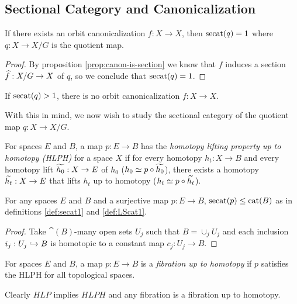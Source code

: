 \subsection{Sectional Category and Canonicalization}\label{sec:secat-and-canon}
\begin{proposition}
    If there exists an orbit canonicalization $f : X \to X$, then $\secat(q) = 1$ where $q : X \to X/G$ is the quotient map.
    \begin{proof}
        By proposition \ref{prop:canon-is-section} we know that $f$ induces a section $\Hat{f} : X/G \to X$ of $q$, so we conclude that $\secat(q) = 1$.
    \end{proof}
\end{proposition}

\begin{corollary}
    If $\secat(q) > 1$, there is no orbit canonicalization $f : X \to X$.
\end{corollary}

With this in mind, we now wish to study the sectional category of the quotient map $q : X \to X/G$.

\begin{definition}
    For spaces $E$ and $B$, a map $p : E \to B$ has the \emph{homotopy lifting property up to homotopy (HLPH)} for a space $X$ if for every homotopy $h_t : X \to B$ and every homotopy lift $\Tilde{h_0} : X \to E$ of $h_0$ ($h_0 \simeq p \circ \Tilde{h_0}$), there exists a homotopy $\Tilde{h_t} : X \to E$ that lifts $h_t$ up to homotopy ($h_t \simeq p \circ \Tilde{h_t}$).
\end{definition}

\begin{proposition}
    For any spaces $E$ and $B$ and a surjective map $p : E \to B$, $\secat(p) \leq \cat(B)$ as in definitions \ref{def:secat1} and \ref{def:LScat1}.
    \begin{proof}
        Take $\cat(B)$-many open sets $U_j$ such that $B = \cup_j U_j$ and each inclusion $i_j : U_j \ito B$ is homotopic to a constant map $c_j : U_j \to B$.
    \end{proof}
\end{proposition}

\begin{definition}
    For spaces $E$ and $B$, a map $p : E \to B$ is a \emph{fibration up to homotopy} if $p$ satisfies the HLPH for all topological spaces.
\end{definition}

\begin{remark}
    Clearly $HLP$ implies $HLPH$ and any fibration is a fibration up to homotopy.
\end{remark}


